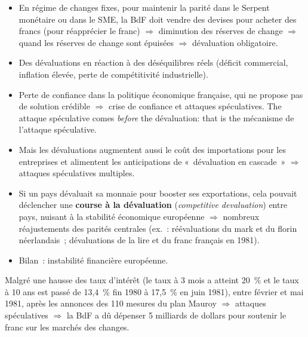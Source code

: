 \begin{itemize}
  \item En régime de changes fixes, pour maintenir la parité dans le Serpent monétaire
    ou dans le SME, la BdF doit vendre des devises pour acheter des francs (pour
    réapprécier le franc) $\Rightarrow$ diminution des réserves de change $\Rightarrow$
    quand les réserves de change sont épuisées $\Rightarrow$ dévaluation obligatoire.
  \item Des dévaluations en réaction à des déséquilibres réels (déficit commercial,
    inflation élevée, perte de compétitivité industrielle).
  \item Perte de confiance dans la politique économique française, qui ne propose pas
    de solution crédible $\Rightarrow$ crise de confiance et attaques spéculatives. The
    attaque spéculative comes \emph{before} the dévaluation: that is the mécanisme de l'attaque
    spéculative.
  \item Mais les dévaluations augmentent aussi le coût des importations pour les
    entreprises et alimentent les anticipations de «~dévaluation en cascade~»
    $\Rightarrow$ attaques spéculatives multiples.
  \item Si un pays dévaluait sa monnaie pour booster ses exportations, cela pouvait
    déclencher une \textbf{course à la dévaluation} (\textit{competitive devaluation})
    entre pays, nuisant à la stabilité économique européenne $\Rightarrow$ nombreux
    réajustements des parités centrales (ex.~: réévaluations du mark et du florin
    néerlandais~; dévaluations de la lire et du franc français en 1981).
  \item Bilan~: instabilité financière européenne.
\end{itemize}

\begin{example}
  Malgré une hausse des taux d'intérêt (le taux à 3 mois a atteint 20~\% et le taux à
  10 ans est passé de 13,4~\% fin 1980 à 17,5~\% en juin 1981), entre février et mai
  1981, après les annonces des 110 mesures du plan Mauroy $\Rightarrow$ attaques
  spéculatives $\Rightarrow$ la BdF a dû dépenser 5 milliards de dollars pour soutenir
  le franc sur les marchés des changes.
\end{example}

